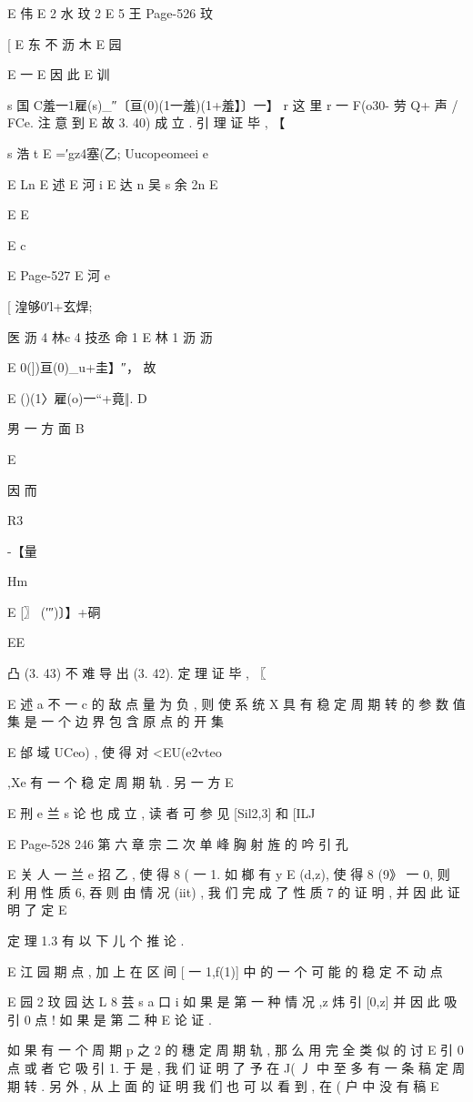 {{{E 伟
E
2
水
玟 2
E 5 王
Page-526
玟

[
E 东 不 沥 木
E 园

E 一
E
因 此
E 训

s
国 C羞一1雇(s)_″〔亘(0)(1一羞)(1+羞】〕一】
r
这 里 r 一 F(o30- 劳 Q+ 声 / FCe. 注 意 到
E
故 3. 40) 成 立 . 引 理 证 毕 , 【

s 浩 t
E =′gz4塞(乙; Uucopeomeei e

E Ln
E 述
E 河 i
E 达 n 吴 s 余 2n
E

E
E

E
c

E
Page-527
E 河 e

[
湟够0′l+玄焊;

医 沥 4 林c 4 技丞
命 1
E 林
1 沥 沥

E 0(])亘(0)_u+圭】″，
故

E ()(1〉雇(o)一“+竟‖.
D

男 一 方 面
B

E

因 而

R3

-【量

Hm

E [〗 (′″)〕】+硐

EE

凸 (3. 43) 不 难 导 出 (3. 42). 定 理 证 毕 , 〖

E 述 a 不 一 c
的 敌 点 量 为 负 , 则 使 系 统 X 具 有 稳 定 周 期 转 的 参 数 值 集 是 一 个
边 界 包 含 原 点 的 开 集

E
邰 域 UCeo) , 使 得 对 <EU(e2vteo},Xe 有 一 个 稳 定 周 期 轨 . 另 一 方
E

E 刑 e 兰 s
论 也 成 立 , 读 者 可 参 见 [Sil2,3] 和 [ILJ

E
Page-528
246 第 六 章 宗 二 次 单 峰 胸 射 旌 的 吟 引 孔

E 关 人 一 兰 e 招
乙 , 使 得 8 ( 一 1. 如 榔 有 y E (d,z), 使 得 8 (9》 一 0, 则 利 用 性
质 6, 吞 则 由 情 况 (iit) , 我 们 完 成 了 性 质 7 的 证 明 , 并 因 此 证 明 了 定
E

定 理 1.3 有 以 下 儿 个 推 论 .

E 江 园
期 点 , 加 上 在 区 间 [ 一 1,f(1)] 中 的 一 个 可 能 的 稳 定 不 动 点

E 园 2
玟
园 达 L 8 芸 s
a 口 i
如 果 是 第 一 种 情 况 ,z 炜 引 [0,z] 并 因 此 吸 引 0 点 ! 如 果 是 第 二 种
E
论 证 .

如 果 有 一 个 周 期 p 之 2 的 穗 定 周 期 轨 , 那 么 用 完 全 类 似 的 讨
E
引 0 点 或 者 它 吸 引 1. 于 是 , 我 们 证 明 了 予 在 J( 丿 中 至 多 有 一 条 稿
定 周 期 转 . 另 外 , 从 上 面 的 证 明 我 们 也 可 以 看 到 , 在 ( 户 中 没 有 稿
E

}}
